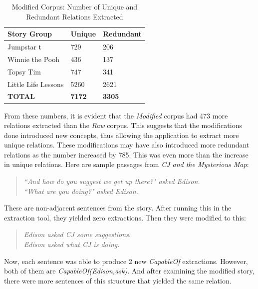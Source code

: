 \begin{table}[H]   %
\centering
\caption{Modified Corpus: Number of Unique and Redundant Relations Extracted} \vspace{0.25em}
\begin{tabular}{|p{4cm}|p{3cm}|p{3cm}|} \hline
\textbf{Story Group} & \textbf{Unique} & \textbf{Redundant} \\ \hline
Jumpstar
t & 729 & 206 \\ \hline
Winnie the Pooh & 436 & 137 \\ \hline
Topsy Tim & 747 & 341 \\ \hline
Little Life Lessons & 5260 & 2621 \\ \hline
\textbf{TOTAL} & \textbf{7172} & \textbf{3305} \\ \hline
\end{tabular}
\label{tab:modifiedtotal}
\end{table}

From these numbers, it is evident that the \textit{Modified} corpus had 473 more relations extracted than the \textit{Raw} corpus. This suggests that the modifications done introduced new concepts, thus allowing the application to extract more unique relations. These modifications may have also introduced more redundant relations as the number increased by 785. This was even more than the increase in unique relations. Here are sample passages from \textit{CJ and the Mysterious Map}:

\begin{verse}
\itshape
``And how do you suggest we get up there?" asked Edison.\\
``What are you doing?" asked Edison.\\
\end{verse}

These are non-adjacent sentences from the story. After running this in the extraction tool, they yielded zero extractions. Then they were modified to this:

\begin{verse}
\itshape
Edison asked CJ some suggestions.\\
Edison asked what CJ is doing.\\
\end{verse}

Now, each sentence was able to produce 2 new \textit{CapableOf} extractions. However, both of them are \textit{CapableOf(Edison,ask)}. And after examining the modified story, there were more sentences of this structure that yielded the same relation. 

